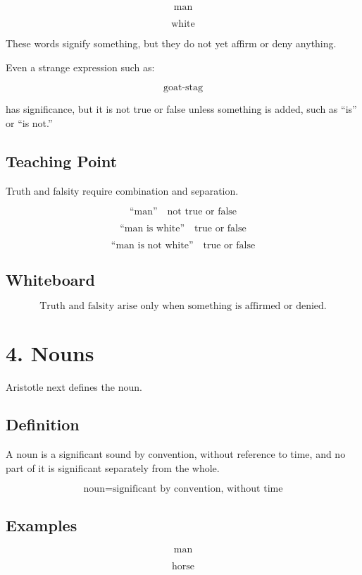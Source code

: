 \documentclass[12pt]{article}
\begin{document}
\[
\text{man}
\]

\[
\text{white}
\]

These words signify something, but they do not yet affirm or deny anything.

Even a strange expression such as:

\[
\text{goat-stag}
\]

has significance, but it is not true or false unless something is added, such
as ``is'' or ``is not.''

\subsection*{Teaching Point}

Truth and falsity require combination and separation.

\[
\text{``man''} \quad \text{not true or false}
\]

\[
\text{``man is white''} \quad \text{true or false}
\]

\[
\text{``man is not white''} \quad \text{true or false}
\]

\subsection*{Whiteboard}

\[
\boxed{
\text{Truth and falsity arise only when something is affirmed or denied.}
}
\]

\section*{4. Nouns}

Aristotle next defines the noun.

\subsection*{Definition}

A noun is a significant sound by convention, without reference to time, and no
part of it is significant separately from the whole.

\[
\boxed{
\text{noun} = \text{significant by convention, without time}
}
\]

\subsection*{Examples}

\[
\text{man}
\]

\[
\text{horse}
\]
\end{document}
